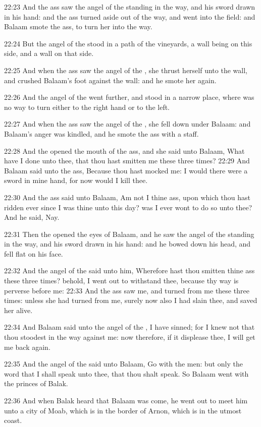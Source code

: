 22:23 And the ass saw the angel of the \LORD standing in the way, and
his sword drawn in his hand: and the ass turned aside out of the way,
and went into the field: and Balaam smote the ass, to turn her into
the way.

22:24 But the angel of the \LORD stood in a path of the vineyards, a
wall being on this side, and a wall on that side.

22:25 And when the ass saw the angel of the \LORD, she thrust herself
unto the wall, and crushed Balaam's foot against the wall: and he
smote her again.

22:26 And the angel of the \LORD went further, and stood in a narrow
place, where was no way to turn either to the right hand or to the
left.

22:27 And when the ass saw the angel of the \LORD, she fell down under
Balaam: and Balaam's anger was kindled, and he smote the ass with a
staff.

22:28 And the \LORD opened the mouth of the ass, and she said unto
Balaam, What have I done unto thee, that thou hast smitten me these
three times?  22:29 And Balaam said unto the ass, Because thou hast
mocked me: I would there were a sword in mine hand, for now would I
kill thee.

22:30 And the ass said unto Balaam, Am not I thine ass, upon which
thou hast ridden ever since I was thine unto this day? was I ever wont
to do so unto thee? And he said, Nay.

22:31 Then the \LORD opened the eyes of Balaam, and he saw the angel of
the \LORD standing in the way, and his sword drawn in his hand: and he
bowed down his head, and fell flat on his face.

22:32 And the angel of the \LORD said unto him, Wherefore hast thou
smitten thine ass these three times? behold, I went out to withstand
thee, because thy way is perverse before me: 22:33 And the ass saw me,
and turned from me these three times: unless she had turned from me,
surely now also I had slain thee, and saved her alive.

22:34 And Balaam said unto the angel of the \LORD, I have sinned; for I
knew not that thou stoodest in the way against me: now therefore, if
it displease thee, I will get me back again.

22:35 And the angel of the \LORD said unto Balaam, Go with the men: but
only the word that I shall speak unto thee, that thou shalt speak. So
Balaam went with the princes of Balak.

22:36 And when Balak heard that Balaam was come, he went out to meet
him unto a city of Moab, which is in the border of Arnon, which is in
the utmost coast.

